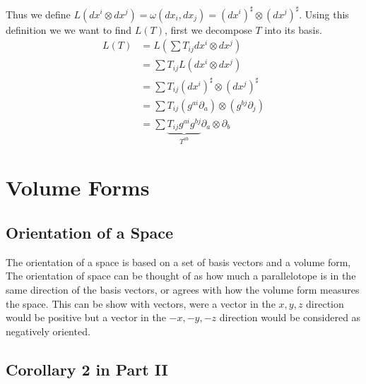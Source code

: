 \documentclass[12pt]{armath}
\begin{document}
  \begin{center}
  \end{center}

  Thus we define $L(dx^i\otimes
  dx^j)=\omega(dx_i,dx_j)=\left(dx^i\right)^\sharp\otimes\left(dx^j\right)^\sharp$.
  Using this definition we we want to find $L(T)$, first we decompose $T$
  into its basis.
  \begin{align*}
    L(T)&=L(\sum T_{ij}dx^i\otimes dx^j)\\
        &=\sum T_{ij}L(dx^i\otimes dx^j)\\
        &=\sum T_{ij}\left(dx^i\right)^\sharp\otimes\left(dx^j\right)^\sharp\\
        &=\sum
        T_{ij}\left(g^{ai}\partial_a\right)\otimes\left(g^{bj}\partial_j\right)\\
        &=\sum \underbrace{T_{ij}g^{ai}g^{bj}}_{T^{ab}}\partial_a\otimes\partial_b
  \end{align*}


  \section{Volume Forms}%
  \label{sec:volume_forms}

  \subsection{Orientation of a Space}%
  \label{sub:orientation_of_a_space}

  The orientation of a space is based on a set of basis vectors and a volume
  form, The orientation of space can be thought of as how much a parallelotope is
  in the same direction of the basis vectors, or agrees with how the volume
  form measures the space. This can be show with vectors, were a vector in the
  $x,y,z$ direction would be positive but a vector in the $-x,-y,-z$ direction
  would be considered as negatively oriented.

  \subsection{Corollary 2 in Part II}%
  \label{sub:corollary_2_in_part_ii}
\end{document}
